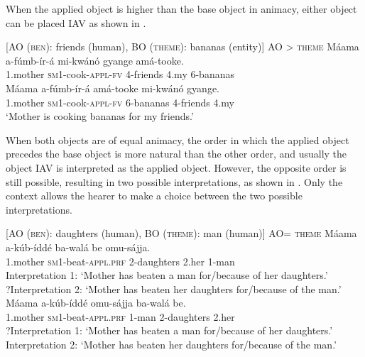 \documentclass[output=paper,
            colorlinks, citecolor=brown
            ,draftmode
		  ]{langscibook}
\begin{document}
When the applied object is higher than the base object in animacy, either object can be placed IAV as shown in .

\ea%
    \label{ex:yoneda:12}
    [AO (\textsc{ben}): friends (human), BO (\textsc{theme}): bananas (entity)]  AO > \textsc{theme}
    \ea\label{ex:yoneda:12a}\gll Máama     a-fúmb-ír-á          mi-kwánó   gyange   amá-tooke.\\
         1.mother    \textsc{sm1}-cook-\textsc{appl-fv}  4-friends    4.my    6-bananas\\
    \ex\label{ex:yoneda:12b} \gll Máama     a-fúmb-ír-á           amá-tooke  mi-kwánó   gyange.\\
    1.mother    \textsc{sm1}-cook-\textsc{appl-fv}  6-bananas  4-friends    4.my\\
    \glt ‘Mother is cooking bananas for my friends.’
    \z
\z
    


When both objects are of equal animacy, the order in which the applied object precedes the base object  is more natural than the other order, and usually the object IAV is interpreted as the applied object. However, the opposite order is still possible, resulting in two possible interpretations, as shown in . Only the context allows the hearer to make a choice between the two possible interpretations.

\newpage
\ea%
    \label{ex:yoneda:13}
    [AO (\textsc{ben}): daughters (human), BO (\textsc{theme}): man (human)]  AO= \textsc{theme}
    \ea\label{ex:yoneda:13a}\gll Máama     a-kúb-íddé           ba-walá       be     omu-sájja.\\
         1.mother    \textsc{sm1}-beat-\textsc{appl.prf}  2-daughters  2.her  1-man \\
    \glt Interpretation 1:  ‘Mother has beaten a man for/because of her daughters.’ \\
     ?Interpretation 2:  ‘Mother has beaten her daughters for/because of the man.’
     \ex\label{ex:yoneda:13b}\gll Máama     a-kúb-íddé           omu-sájja   ba-walá       be.\\
     1.mother    \textsc{sm1}-beat-\textsc{appl.prf}  1-man      2-daughters  2.her\\
     \glt ?Interpretation 1:  ‘Mother has beaten a man for/because of her daughters.’   \\
       Interpretation 2:  ‘Mother has beaten her daughters for/because of the man.’
    \z
\z
\end{document}
